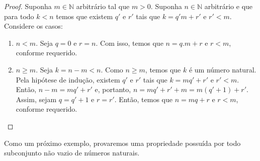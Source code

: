 \begin{proof}
  Suponha $m \in \mathbb{N}$ arbitrário tal que $m > 0$. Suponha $n
  \in \mathbb{N}$ arbitrário e que para todo $k < n$ temos que existem
  $q'$ e $r'$ tais que $k = q'm + r'$ e $r' < m$. Considere os casos:
  \begin{enumerate}
    \item $n < m$. Seja $q = 0$ e $r = n$. Com isso, temos que $n
      = q.m + r$ e $r < m$, conforme requerido.
    \item $n \geq m$. Seja $k = n - m < n$. Como $n \geq m$, temos que
      $k$ é um número natural. Pela hipótese de indução, existem $q'$
      e $r'$ tais que $k = mq' + r'$ e $r' < m$. Então, $n - m = mq' +
      r'$ e, portanto, $n = mq' + r' + m = m (q'  +1) + r'$. Assim,
      sejam $q = q' + 1$ e $r = r'$. Então, temos que $n = mq + r$ e
      $r < m$, conforme requerido.
  \end{enumerate}
\end{proof}

Como um próximo exemplo, provaremos uma propriedade possuída por todo
subconjunto não vazio de números naturais.

